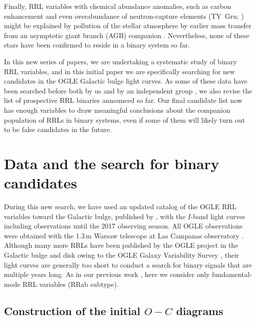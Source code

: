 \documentclass[twocolumn,times]{aastex63}
\begin{document}
Finally, RRL variables with chemical abundance anomalies, such as carbon enhancement
\citep{2011A&A...527A..65H,2014ApJ...787....6K} and even overabundance of neutron-capture elements (TY~Gru; \citealt{2006AJ....132.1714P})
might be explained by pollution of the stellar atmosphere by earlier mass transfer from an asymptotic giant branch (AGB)
companion \citep{2013MNRAS.435..698S}. Nevertheless, none of these stars have been confirmed to reside
in a binary system so far.

In this new series of papers, we are undertaking a systematic study of binary
RRL variables, and in this initial paper we are specifically searching for new
candidates in the OGLE Galactic bulge light curves. As some of these data
have been searched before both by us \citep{2015MNRAS.449L.113H,2018pas6.conf..248H}
and by an independent group \citep{2019MNRAS.487L...1P}, we also revise the list
of prospective RRL binaries announced so far. Our final candidate list now has enough variables
to draw meaningful conclusions about the companion population of RRLs in binary systems, even
if some of them will likely turn out to be false candidates in the future.


\section{Data and the search for binary candidates} \label{sec:search}

During this new search, we have used an updated catalog of the OGLE RRL variables toward the Galactic bulge, published
by \citet{2014AcA....64..177S}, with the $I$-band  light curves including observations until the 2017 observing season.
All OGLE observations were obtained with the 1.3\,m Warsaw telescope at Las Campanas observatory \citep{2015AcA....65....1U}.
Although many more RRLs have been published by the OGLE project in the Galactic bulge and disk owing to the OGLE Galaxy
Variability Survey \citep{2019AcA....69..321S}, their light curves are generally too short to conduct a search for
binary signals that are multiple years long.
As in our previous work \citep{2015MNRAS.449L.113H}, here we consider only fundamental-mode RRL
variables (RRab subtype).

\subsection{Construction of the initial $O-C$ diagrams} \label{subsec:initial}
\end{document}
